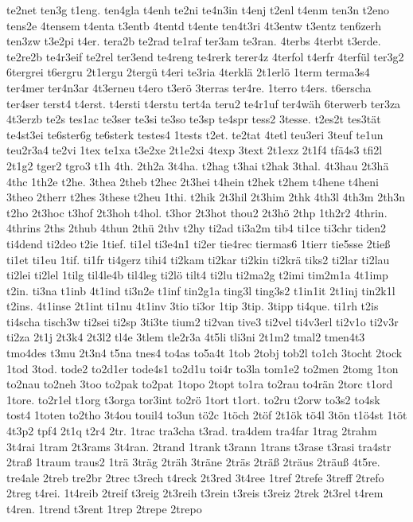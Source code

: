 {te2net
ten3g
t1eng.
ten4gla
t4enh
te2ni
te4n3in
t4enj
t2enl
t4enm
ten3n
t2eno
tens2e
4tensem
t4enta
t3entb
4tentd
t4ente
ten4t3ri
4t3entw
t3entz
ten6zerh
ten3zw
t3e2pi
t4er.
tera2b
te2rad
te1raf
ter3am
te3ran.
4terbs
4terbt
t3erde.
te2re2b
te4r3eif
te2rel
ter3end
te4reng
te4rerk
terer4z
4terfol
t4erfr
4terfül
ter3g2
6tergrei
t6ergru
2t1ergu
2tergü
t4eri
te3ria
4terklä
2t1erlö
1term
terma3s4
ter4mer
ter4n3ar
4t3erneu
t4ero
t3erö
3terras
ter4re.
1terro
t4ers.
t6erscha
ter4ser
terst4
t4erst.
t4ersti
t4erstu
tert4a
teru2
te4r1uf
ter4wäh
6terwerb
ter3za
4t3erzb
te2s
tes1ac
te3ser
te3si
te3so
te3sp
te4spr
tess2
3tesse.
t2es2t
tes3tät
te4st3ei
te6ster6g
te6sterk
testes4
1tests
t2et.
te2tat
4tetl
teu3eri
3teuf
te1un
teu2r3a4
te2vi
1tex
te1xa
t3e2xe
2t1e2xi
4texp
3text
2t1exz
2t1f4
tfä4s3
tfi2l
2t1g2
tger2
tgro3
t1h
4th.
2th2a
3t4ha.
t2hag
t3hai
t2hak
3thal.
4t3hau
2t3hä
4thc
1th2e
t2he.
3thea
2theb
t2hec
2t3hei
t4hein
t2hek
t2hem
t4hene
t4heni
3theo
2therr
t2hes
3these
t2heu
1thi.
t2hik
2t3hil
2t3him
2thk
4th3l
4th3m
2th3n
t2ho
2t3hoc
t3hof
2t3hoh
t4hol.
t3hor
2t3hot
thou2
2t3hö
2thp
1th2r2
4thrin.
4thrins
2ths
2thub
4thun
2thü
2thv
t2hy
ti2ad
ti3a2m
tib4
ti1ce
ti3chr
tiden2
ti4dend
ti2deo
t2ie
1tief.
ti1el
ti3e4n1
ti2er
tie4rec
tiermas6
1tierr
tie5sse
2tieß
ti1et
ti1eu
1tif.
ti1fr
ti4gerz
tihi4
ti2kam
ti2kar
ti2kin
ti2krä
tiks2
ti2lar
ti2lau
ti2lei
ti2lel
1tilg
til4le4b
til4leg
ti2lö
tilt4
ti2lu
ti2ma2g
t2imi
tim2m1a
4t1imp
t2in.
ti3na
t1inb
4t1ind
ti3n2e
t1inf
tin2g1a
ting3l
ting3s2
t1in1it
2t1inj
tin2k1l
t2ins.
4t1inse
2t1int
ti1nu
4t1inv
3tio
ti3or
1tip
3tip.
3tipp
ti4que.
ti1rh
t2is
ti4scha
tisch3w
ti2sei
ti2sp
3ti3te
tium2
ti2van
tive3
ti2vel
ti4v3erl
ti2v1o
ti2v3r
ti2za
2t1j
2t3k4
2t3l2
tl4e
3tlem
tle2r3a
4t5li
tli3ni
2t1m2
tmal2
tmen4t3
tmo4des
t3mu
2t3n4
t5na
tnes4
to4as
to5a4t
1tob
2tobj
tob2l
to1ch
3tocht
2tock
1tod
3tod.
tode2
to2d1er
tode4s1
to2d1u
toi4r
to3la
tom1e2
to2men
2tomg
1ton
to2nau
to2neh
3too
to2pak
to2pat
1topo
2topt
to1ra
to2rau
to4rän
2torc
t1ord
1tore.
to2r1el
t1org
t3orga
tor3int
to2rö
1tort
t1ort.
to2ru
t2orw
to3s2
to4sk
tost4
1toten
to2tho
3t4ou
touil4
to3un
tö2c
1töch
2töf
2t1ök
tö4l
3tön
t1ö4st
1töt
4t3p2
tpf4
2t1q
t2r4
2tr.
1trac
tra3cha
t3rad.
tra4dem
tra4far
1trag
2trahm
3t4rai
1tram
2t3rams
3t4ran.
2trand
1trank
t3rann
1trans
t3rase
t3rasi
tra4str
2traß
1traum
traus2
1trä
3träg
2träh
3träne
2träs
2träß
2träus
2träuß
4t5re.
tre4ale
2treb
tre2br
2trec
t3rech
t4reck
2t3red
3t4ree
1tref
2trefe
3treff
2trefo
2treg
t4rei.
1t4reib
2treif
t3reig
2t3reih
t3rein
t3reis
t3reiz
2trek
2t3rel
t4rem
t4ren.
1trend
t3rent
1trep
2trepe
2trepo
}
